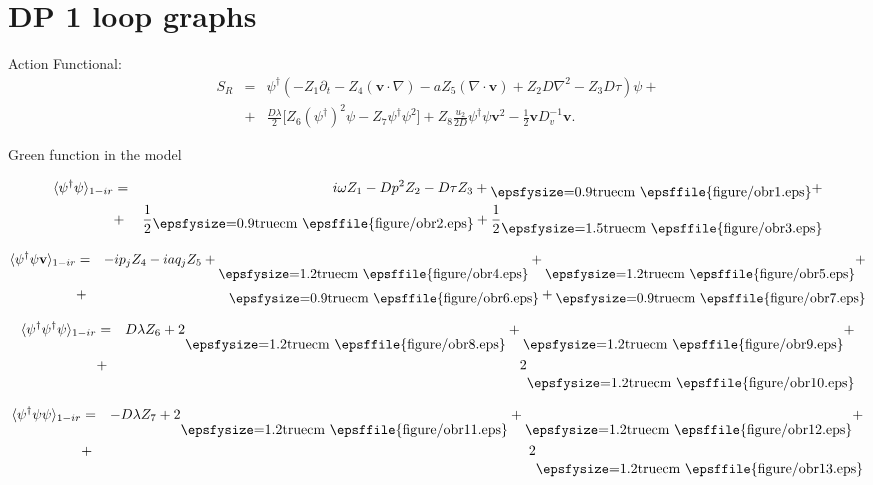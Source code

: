 \documentclass[12pt]{article}
\newcommand{\psid}{\psi^{\dagger}}
\begin{document}
\section*{DP 1 loop graphs}

Action Functional:
\begin{eqnarray}
S_R &=& \psid (-Z_1\partial_t - Z_4(\mathbf{v}\cdot\nabla) - a Z_5 (\nabla\cdot
{\mathbf v})+ Z_2 D \nabla^2 - Z_3 D \tau) \psi +  \nonumber \\
 &+& \frac{D \lambda}{2} \Big[ Z_6 (\psid)^2 \psi - Z_7 \psid \psi^2 \Big] 
 +Z_8 \frac{u_2}{2D} \psid \psi \mathbf{v}^2  - \frac{1}{2} \mathbf{ v} D^{-1}_v  \mathbf{v}. 
\end{eqnarray}


Green function in the model

\begin{eqnarray}
  \langle \psid \psi \rangle_{1-ir} &=& i\omega Z_1 - D p^2 Z_2 -
   D \tau Z_3 + \raisebox{-0.7ex}{\epsfysize=0.9truecm \epsffile  {figure/obr1.eps}} 
  + \nonumber \\ 
  & + & \frac{1}{2}  \raisebox{-0.7ex}{\epsfysize=0.9truecm \epsffile{figure/obr2.eps}} + 
  \frac{1}{2}  \raisebox{-1.5ex}   {\epsfysize=1.5truecm \epsffile{figure/obr3.eps}}
\end{eqnarray}

\begin{eqnarray}
  \langle \psid \psi {\mathbf v} \rangle_{1-ir} &=&  -i p_j Z_4 -i a q_j Z_5 + 
  \raisebox{-2.5ex}{\epsfysize=1.2truecm \epsffile{figure/obr4.eps}}+
  \raisebox{-2.5ex}{\epsfysize=1.2truecm \epsffile{figure/obr5.eps}}+ \nonumber \\
  & + & \raisebox{-0.7ex}{\epsfysize=0.9truecm \epsffile{figure/obr6.eps}} +
  \raisebox{-0.7ex}{\epsfysize=0.9truecm \epsffile{figure/obr7.eps}}
\end{eqnarray}

\begin{eqnarray}  
  \langle \psid \psid \psi \rangle_{1-ir} &=& D \lambda Z_6 +
   2 \raisebox{-2.5ex}{\epsfysize=1.2truecm \epsffile{figure/obr8.eps}}+ 
  \raisebox{-2.5ex}{\epsfysize=1.2truecm \epsffile{figure/obr9.eps}}+ \nonumber \\
  & + & 2 \raisebox{-3ex}{\epsfysize=1.2truecm \epsffile{figure/obr10.eps}}
\end{eqnarray}

\begin{eqnarray}  
  \langle \psid \psi \psi \rangle_{1-ir}  & = &
  -D \lambda Z_7 +  2 \raisebox{-2.5ex}{\epsfysize=1.2truecm \epsffile{figure/obr11.eps}}+ 
  \raisebox{-2.5ex}{\epsfysize=1.2truecm \epsffile{figure/obr12.eps}}+ \nonumber\\
  & + & 2 \raisebox{-3ex}{\epsfysize=1.2truecm \epsffile{figure/obr13.eps}}
\end{eqnarray}  
  
\end{document}
